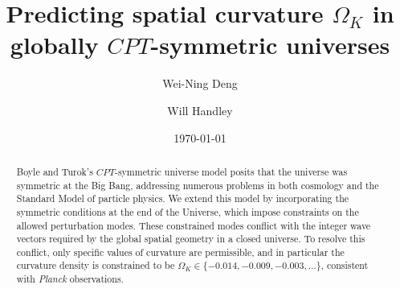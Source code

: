 \documentclass[%
 reprint,
 amsmath,amssymb,
 prl,
]{revtex4-2}
\begin{document}

\title{Predicting spatial curvature \(\Omega_K\) in globally $CPT$-symmetric universes}%

\author{Wei-Ning Deng}
 

\author{Will Handley}%


\date{\today}%

\begin{abstract}
    Boyle and Turok's $CPT$-symmetric universe model posits that the universe was symmetric at the Big Bang, addressing numerous problems in both cosmology and the Standard Model of particle physics. We extend this model by incorporating the symmetric conditions at the end of the Universe, which impose constraints on the allowed perturbation modes. These constrained modes conflict with the integer wave vectors required by the global spatial geometry in a closed universe. To resolve this conflict, only specific values of curvature are permissible, and in particular the curvature density is constrained to be $\Omega_K \in \{-0.014, -0.009, -0.003, \ldots\}$, consistent with \textit{Planck} observations.
\end{abstract}

\maketitle
\end{document}
